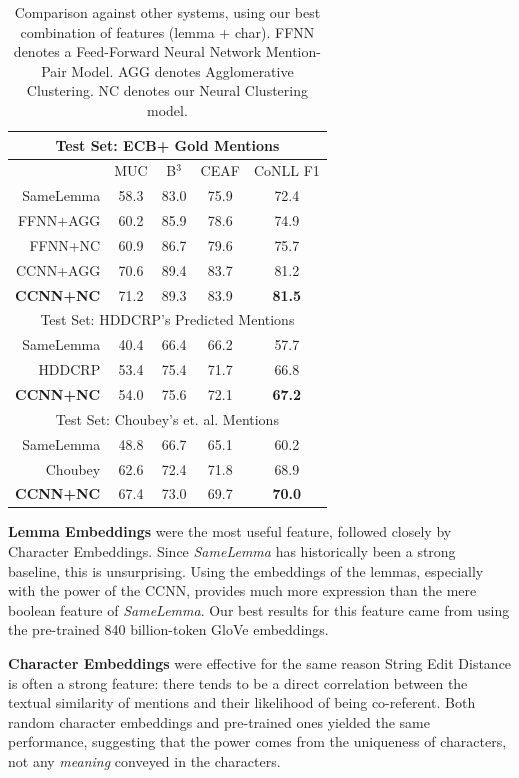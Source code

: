 \documentclass[11pt,a4paper]{article}
\begin{document}
\begin{table}[h]
\centering
\tabcolsep=0.11cm
\begin{tabular}{|r|ccc|c|}
 \hline
 \multicolumn{5}{|c|}{Test Set: ECB+ Gold Mentions} \\
 \hline
& MUC & B$^3$ & CEAF & CoNLL F1\\
 \hline
 SameLemma& 58.3 & 83.0 & 75.9 & 72.4\\
FFNN+AGG & 60.2 & 85.9 & 78.6 & 74.9 \\
FFNN+NC & 60.9 & 86.7 &  79.6 & 75.7 \\
CCNN+AGG & 70.6 & 89.4 & 83.7  & 81.2\\
\textbf{CCNN+NC}  & 71.2 & 89.3 & 83.9 & \textbf{81.5} \\
\hline
\hline
 \multicolumn{5}{|c|}{Test Set: HDDCRP's Predicted Mentions} \\
 \hline
 SameLemma& 40.4 & 66.4 & 66.2 & 57.7\\
 HDDCRP & 53.4 & 75.4 & 71.7  & 66.8\\
 \textbf{CCNN+NC} & 54.0 & 75.6 & 72.1  & \textbf{67.2}\\
 \hline
\hline
 \multicolumn{5}{|c|}{Test Set: Choubey's et. al. Mentions} \\
 \hline
 SameLemma& 48.8 & 66.7 & 65.1 & 60.2\\
 Choubey & 62.6 & 72.4 & 71.8  & 68.9\\
 \textbf{CCNN+NC} & 67.4 & 73.0 & 69.7  & \textbf{70.0}\\
 \hline
\end{tabular}
\caption{Comparison against other systems, using our best combination of features (lemma + char). FFNN denotes a Feed-Forward Neural Network Mention-Pair Model.  AGG denotes Agglomerative Clustering.  NC denotes our Neural Clustering model.}
\label{tab:others}
\end{table}

\textbf{Lemma Embeddings} were the most useful feature, followed closely by Character Embeddings.  Since \textit{SameLemma} has historically been a strong baseline, this is unsurprising.  Using the embeddings of the lemmas, especially with the power of the CCNN, provides much more expression than the mere boolean feature of \textit{SameLemma}.  Our best results for this feature came from using the pre-trained 840 billion-token GloVe embeddings.

\textbf{Character Embeddings} were effective for the same reason String Edit Distance is often a strong feature: there tends to be a direct correlation between the textual similarity of mentions and their likelihood of being co-referent. Both random character embeddings and pre-trained ones yielded the same performance, suggesting that the power comes from the uniqueness of characters, not any \textit{meaning} conveyed in the characters.
\end{document}
